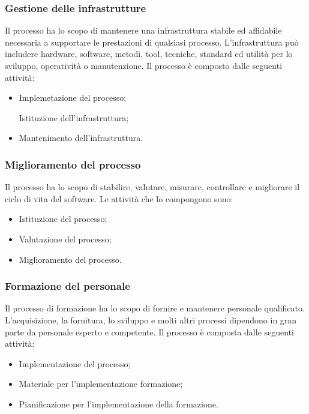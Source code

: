 \subsubsection{Gestione delle infrastrutture}
Il processo ha lo scopo di mantenere una infrastruttura stabile ed affidabile necessaria a supportare le prestazioni di qualsiasi processo. L’infrastruttura può includere hardware, software, metodi, tool, tecniche, standard ed utilità per lo sviluppo, operatività o manutenzione.
Il processo è composto dalle seguenti attività:
\begin{itemize}
	\item Implemetazione del processo;
	
	\itme Istituzione dell'infrastruttura;
	
	\item Mantenimento dell'infrastruttura.
\end{itemize}

\subsubsection{Miglioramento del processo}
Il processo ha lo scopo di stabilire, valutare, misurare, controllare e migliorare il ciclo di vita del software. Le attività che lo compongono sono:
\begin{itemize}
	\item Istituzione del processo;
	
	\item Valutazione del processo;
	
	\item Miglioramento del processo.
\end{itemize}

\subsubsection{Formazione del personale}
Il processo di formazione ha lo scopo di fornire e mantenere personale qualificato. L'acquisizione, la fornitura, lo sviluppo e molti altri processi dipendono in gran parte da personale esperto e competente.
Il processo è composta dalle seguenti attività:
\begin{itemize}
	\item Implementazione del processo;
	
	\item Materiale per l'implementazione formazione;
	
	\item Pianificazione per l'implementazione della formazione.
\end{itemize}


